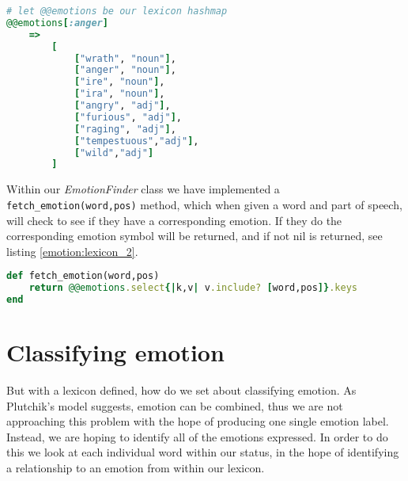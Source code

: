 \begin{lstlisting}[language=Ruby, numbers=none, caption={Example key usage for emotion lexicon hashmap}, label=emotion:lexicon_1]
# let @@emotions be our lexicon hashmap
@@emotions[:anger]
	=>
		[
			["wrath", "noun"], 
			["anger", "noun"], 
			["ire", "noun"], 
			["ira", "noun"], 
			["angry", "adj"], 
			["furious", "adj"], 
			["raging", "adj"], 
			["tempestuous","adj"], 
			["wild","adj"]
		]
\end{lstlisting}

Within our \emph{EmotionFinder} class we have implemented a \texttt{fetch\-\_emotion\-(word,pos)} method, which when given a word and part of speech, will check to see if they have a corresponding emotion. If they do the corresponding emotion symbol will be returned, and if not nil is returned, see listing \ref{emotion:lexicon_2}.

\begin{lstlisting}[language=Ruby, caption={\emph{EmotionFinder} method for determining whether a word and its corresponding part of speech indicate an emotion}, label=emotion:lexicon_2]
def fetch_emotion(word,pos)
	return @@emotions.select{|k,v| v.include? [word,pos]}.keys
end
\end{lstlisting}

\section{Classifying emotion}

But with a lexicon defined, how do we set about classifying emotion. As Plutchik's model suggests, emotion can be combined, thus we are not approaching this problem with the hope of producing one single emotion label. Instead, we are hoping to identify all of the emotions expressed. In order to do this we look at each individual word within our status, in the hope of identifying a relationship to an emotion from within our lexicon.

